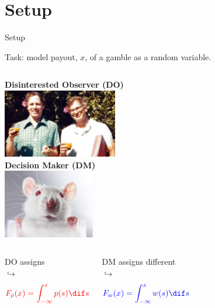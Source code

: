 \section{Setup}
\begin{frame}{Setup}
\begin{center}
Task: model payout, $x$, of a gamble as a random variable.
\end{center}
\begin{columns}[T]
	\centering
	\textbf{Disinterested Observer (DO)} \\
	\vspace{0.5em}
	\includegraphics[height=3cm]{img/TverskyKahnemanFunny} \\
	\vspace{0.5em}
	\centering
	\textbf{Decision Maker (DM)} \\
	\vspace{0.5em}
	\includegraphics[height=3cm]{img/LabRat} \\
	\vspace{0.5em}
\end{columns}

\begin{columns}[T]
	\vspace{1em}
	DO assigns  \\
  $\hookrightarrow$ %
  $$  \red{F_p(x)=\int_{-\infty}^x p(s) \dif s} $$
  
	\vspace{1em}
  DM assigns different \\
  $\hookrightarrow$ %
 $$ \blue{F_w(x)=\int_{-\infty}^x w(s) \dif s} $$
  
\end{columns}
\end{frame}

